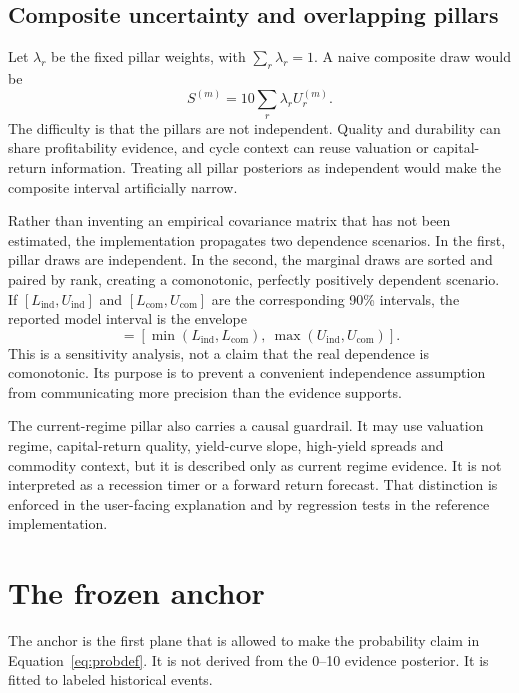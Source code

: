 \documentclass[11pt]{article}
\begin{document}
\subsection{Composite uncertainty and overlapping pillars}

Let $\lambda_r$ be the fixed pillar weights, with $\sum_r\lambda_r=1$. A naive composite draw would be
\begin{equation}
S^{(m)}=10\sum_r\lambda_rU_r^{(m)}.
\label{eq:composite}
\end{equation}
The difficulty is that the pillars are not independent. Quality and durability can share profitability evidence, and cycle context can reuse valuation or capital-return information. Treating all pillar posteriors as independent would make the composite interval artificially narrow.

Rather than inventing an empirical covariance matrix that has not been estimated, the implementation propagates two dependence scenarios. In the first, pillar draws are independent. In the second, the marginal draws are sorted and paired by rank, creating a comonotonic, perfectly positively dependent scenario. If $[L_{\mathrm{ind}},U_{\mathrm{ind}}]$ and $[L_{\mathrm{com}},U_{\mathrm{com}}]$ are the corresponding 90\% intervals, the reported model interval is the envelope
\begin{equation}
[L,U]=\left[\min(L_{\mathrm{ind}},L_{\mathrm{com}}),\ 
\max(U_{\mathrm{ind}},U_{\mathrm{com}})\right].
\label{eq:depenvelope}
\end{equation}
This is a sensitivity analysis, not a claim that the real dependence is comonotonic. Its purpose is to prevent a convenient independence assumption from communicating more precision than the evidence supports.

The current-regime pillar also carries a causal guardrail. It may use valuation regime, capital-return quality, yield-curve slope, high-yield spreads and commodity context, but it is described only as current regime evidence. It is not interpreted as a recession timer or a forward return forecast. That distinction is enforced in the user-facing explanation and by regression tests in the reference implementation.

\section{The frozen anchor}
\label{sec:anchor}

The anchor is the first plane that is allowed to make the probability claim in Equation~\eqref{eq:probdef}. It is not derived from the 0--10 evidence posterior. It is fitted to labeled historical events.
\end{document}
